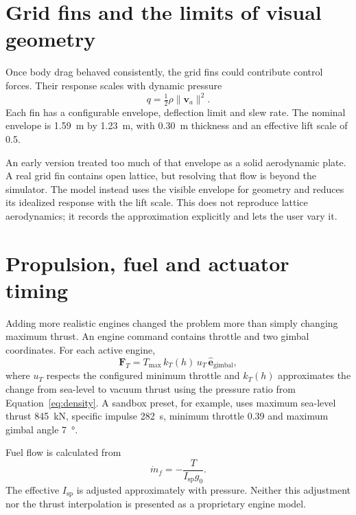\section{Grid fins and the limits of visual geometry}

Once body drag behaved consistently, the grid fins could contribute control forces. Their
response scales with dynamic pressure
\begin{equation}
  q=\tfrac12\rho\lVert\mathbf v_a\rVert^2.
\end{equation}
Each fin has a configurable envelope, deflection limit and slew rate. The nominal envelope is
\SI{1.59}{m} by \SI{1.23}{m}, with \SI{0.30}{m} thickness and an effective lift scale of 0.5.

An early version treated too much of that envelope as a solid aerodynamic plate. A real grid fin
contains open lattice, but resolving that flow is beyond the simulator. The model instead uses
the visible envelope for geometry and reduces its idealized response with the lift scale. This
does not reproduce lattice aerodynamics; it records the approximation explicitly and lets the
user vary it.

\section{Propulsion, fuel and actuator timing}

Adding more realistic engines changed the problem more than simply changing maximum thrust. An
engine command contains throttle and two gimbal coordinates. For each active engine,
\begin{equation}
  \mathbf F_T=T_{\max}\,k_T(h)\,u_T\,\hat{\mathbf e}_{\mathrm{gimbal}},
\end{equation}
where $u_T$ respects the configured minimum throttle and $k_T(h)$ approximates the change from
sea-level to vacuum thrust using the pressure ratio from Equation~\eqref{eq:density}. A sandbox
preset, for example, uses maximum sea-level thrust \SI{845}{kN}, specific impulse \SI{282}{s},
minimum throttle 0.39 and maximum gimbal angle \SI{7}{\degree}.

Fuel flow is calculated from
\begin{equation}
  \dot m_f=-\frac{T}{I_{\mathrm{sp}}g_0}.
  \label{eq:massflow}
\end{equation}
The effective $I_{\mathrm{sp}}$ is adjusted approximately with pressure. Neither this adjustment
nor the thrust interpolation is presented as a proprietary engine model.

